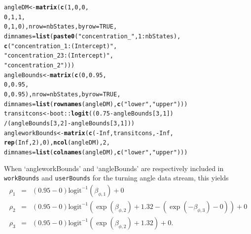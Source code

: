 \documentclass[12pt]{article}\usepackage[]{graphicx}\usepackage[]{color}
\makeatletter
\newcommand{\hlnum}[1]{\textcolor[rgb]{0.686,0.059,0.569}{#1}}%
\newcommand{\hlstr}[1]{\textcolor[rgb]{0.192,0.494,0.8}{#1}}%
\newcommand{\hlopt}[1]{\textcolor[rgb]{0,0,0}{#1}}%
\newcommand{\hlstd}[1]{\textcolor[rgb]{0.345,0.345,0.345}{#1}}%
\newcommand{\hlkwb}[1]{\textcolor[rgb]{0.69,0.353,0.396}{#1}}%
\newcommand{\hlkwc}[1]{\textcolor[rgb]{0.333,0.667,0.333}{#1}}%
\newcommand{\hlkwd}[1]{\textcolor[rgb]{0.737,0.353,0.396}{\textbf{#1}}}%
\newenvironment{kframe}{%
 \def\at@end@of@kframe{}%
 \ifinner\ifhmode%
  \def\at@end@of@kframe{\end{minipage}}%
  \begin{minipage}{\columnwidth}%
 \fi\fi%
 \def\FrameCommand##1{\hskip\@totalleftmargin \hskip-\fboxsep
 \colorbox{shadecolor}{##1}\hskip-\fboxsep
     \hskip-\linewidth \hskip-\@totalleftmargin \hskip\columnwidth}%
 \MakeFramed {\advance\hsize-\width
   \@totalleftmargin\z@ \linewidth\hsize
   \@setminipage}}%
 {\par\unskip\endMakeFramed%
 \at@end@of@kframe}
\newenvironment{knitrout}{}{} %
\makeatother
\begin{document}
\begin{knitrout}
\color{fgcolor}\begin{kframe}
\begin{alltt}
\hlstd{angleDM} \hlkwb{<-} \hlkwd{matrix}\hlstd{(}\hlkwd{c}\hlstd{(}\hlnum{1}\hlstd{,}\hlnum{0}\hlstd{,}\hlnum{0}\hlstd{,}
                    \hlnum{0}\hlstd{,}\hlnum{1}\hlstd{,}\hlnum{1}\hlstd{,}
                    \hlnum{0}\hlstd{,}\hlnum{1}\hlstd{,}\hlnum{0}\hlstd{),}\hlkwc{nrow}\hlstd{=nbStates,}\hlkwc{byrow}\hlstd{=}\hlnum{TRUE}\hlstd{,}
                  \hlkwc{dimnames}\hlstd{=}\hlkwd{list}\hlstd{(}\hlkwd{paste0}\hlstd{(}\hlstr{"concentration_"}\hlstd{,}\hlnum{1}\hlopt{:}\hlstd{nbStates),}
                                \hlkwd{c}\hlstd{(}\hlstr{"concentration_1:(Intercept)"}\hlstd{,}
                                  \hlstr{"concentration_23:(Intercept)"}\hlstd{,}
                                  \hlstr{"concentration_2"}\hlstd{)))}
\hlstd{angleBounds} \hlkwb{<-} \hlkwd{matrix}\hlstd{(}\hlkwd{c}\hlstd{(}\hlnum{0}\hlstd{,}\hlnum{0.95}\hlstd{,}
                        \hlnum{0}\hlstd{,}\hlnum{0.95}\hlstd{,}
                        \hlnum{0}\hlstd{,}\hlnum{0.95}\hlstd{),}\hlkwc{nrow}\hlstd{=nbStates,}\hlkwc{byrow}\hlstd{=}\hlnum{TRUE}\hlstd{,}
                      \hlkwc{dimnames}\hlstd{=}\hlkwd{list}\hlstd{(}\hlkwd{rownames}\hlstd{(angleDM),}\hlkwd{c}\hlstd{(}\hlstr{"lower"}\hlstd{,}\hlstr{"upper"}\hlstd{)))}
\hlstd{transitcons} \hlkwb{<-} \hlstd{boot}\hlopt{::}\hlkwd{logit}\hlstd{((}\hlnum{0.75} \hlopt{-} \hlstd{angleBounds[}\hlnum{3}\hlstd{,}\hlnum{1}\hlstd{])}
                           \hlopt{/}\hlstd{(angleBounds[}\hlnum{3}\hlstd{,}\hlnum{2}\hlstd{]} \hlopt{-} \hlstd{angleBounds[}\hlnum{3}\hlstd{,}\hlnum{1}\hlstd{]))}
\hlstd{angleworkBounds} \hlkwb{<-} \hlkwd{matrix}\hlstd{(}\hlkwd{c}\hlstd{(}\hlopt{-}\hlnum{Inf}\hlstd{,transitcons,}\hlopt{-}\hlnum{Inf}\hlstd{,}
                            \hlkwd{rep}\hlstd{(}\hlnum{Inf}\hlstd{,}\hlnum{2}\hlstd{),}\hlnum{0}\hlstd{),}\hlkwd{ncol}\hlstd{(angleDM),}\hlnum{2}\hlstd{,}
                          \hlkwc{dimnames}\hlstd{=}\hlkwd{list}\hlstd{(}\hlkwd{colnames}\hlstd{(angleDM),}\hlkwd{c}\hlstd{(}\hlstr{"lower"}\hlstd{,}\hlstr{"upper"}\hlstd{)))}
\end{alltt}
\end{kframe}
\end{knitrout}
\noindent When `angleworkBounds' and `angleBounds' are respectively included in \verb|workBounds| and \verb|userBounds| for the turning angle data stream, this yields
\begin{eqnarray*}
\rho_1 &=& \left(0.95-0\right) \text{logit}^{-1} \left( \beta_{\phi,1} \right) + 0 \\
\rho_2 &=& \left(0.95-0\right) \text{logit}^{-1} \left( \exp(\beta_{\phi,2}) + 1.32 - \left( \exp(-\beta_{\phi,3} ) - 0 \right) \right) + 0 \\
\rho_3 &=& \left(0.95-0\right) \text{logit}^{-1} \left( \exp(\beta_{\phi,2}) + 1.32 \right) + 0.
\end{eqnarray*}
\end{document}
